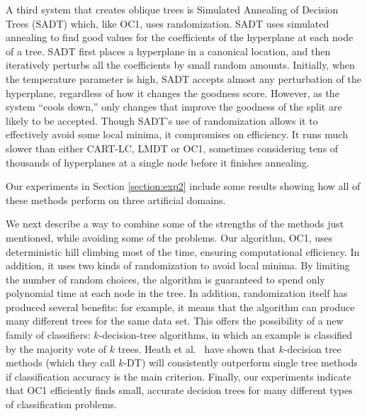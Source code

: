 A third system that creates oblique trees is Simulated Annealing of
Decision Trees (SADT) \cite{heath/etal/93} which, like OC1, uses
randomization.  SADT uses simulated annealing
\cite{kirkpatrick/etal/83} to find good values for the coefficients of
the hyperplane at each node of a tree.  SADT first places a hyperplane
in a canonical location, and then iteratively perturbs all the
coefficients by small random amounts.  Initially, when the temperature
parameter is high, SADT accepts almost any perturbation of the
hyperplane, regardless of how it changes the goodness score.  However,
as the system ``cools down,'' only changes that improve the goodness
of the split are likely to be accepted.  Though SADT's use of
randomization allows it to effectively avoid some local minima, it
compromises on efficiency.  It runs much slower than either CART-LC,
LMDT or OC1, sometimes considering tens of thousands of hyperplanes
at a single node before it finishes annealing.

Our experiments in Section \ref{section:exp2} include some results
showing how all of these methods perform on three artificial domains.

We next describe a way to combine some of the strengths of the methods
just mentioned, while avoiding some of the problems.  Our algorithm,
OC1, uses deterministic hill climbing most of the time, ensuring
computational efficiency.  In addition, it uses two kinds of
randomization to avoid local minima.  By limiting the number of random
choices, the algorithm is guaranteed to spend only polynomial time at
each node in the tree.  In addition, randomization itself has produced
several benefits: for example, it means that the algorithm can produce
many different trees for the same data set.  This offers the
possibility of a new family of classifiers: $k$-decision-tree
algorithms, in which an example is classified by the majority vote of
$k$ trees.  Heath et al.~\citeyear{heath/etal/93b} have shown that
$k$-decision tree methods (which they call $k$-DT) will consistently
outperform single tree methods if classification accuracy is the main
criterion.  Finally, our experiments indicate that OC1 efficiently
finds small, accurate decision trees for many different types of
classification problems.

